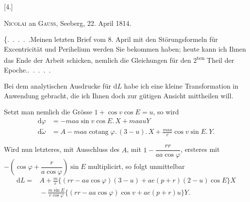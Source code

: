 \clearpage
\begingroup
{}
\renewcommand{\headrulewidth}{0pt}
\par\medskip
{}
\begin{center}
[4.]\par\medskip
\textsc{Nicolai} an \textsc{Gauss}, Seeberg, 22. April 1814.
\end{center}
\par\noindent\hspace*{\parindent}\{.\ .\ .\ .\ .\quad Meinen letzten Brief vom 8. April mit den Störungsformeln für
Excentricität und Perihelium werden Sie bekommen haben; heute kann ich
Ihnen das Ende der Arbeit schicken, nemlich die Gleichungen für den 2\textsuperscript{ten}
Theil der Epoche.\quad .\ .\ .\ .\ .

\par\noindent\hspace*{\parindent}Bei dem analytischen Ausdrucke für \(\mathrm{d}L\) habe ich eine kleine Transformation
in Anwendung gebracht, die ich Ihnen doch zur gütigen Ansicht mittheilen will.

\par\noindent\hspace*{\parindent}Setzt man nemlich die Grösse \(1+\cos v\cos E=u\), so wird
\[
\begin{aligned}
\mathrm{d}\varphi&=-maa\sin v\cos E\mathord{.}\,X+maauY\\
\mathrm{d}\tilde\omega&=A-maa\operatorname{cotang}\varphi\mathord{.}\,(3-u)\mathord{.}\,X
  +\frac{maa}{e}\cos v\sin E\mathord{.}\,Y.
\end{aligned}
\]

\par\noindent\hspace*{\parindent}Wird nun letzteres, mit Ausschluss des \(A\), mit \(1-\dfrac{rr}{aa\cos\varphi}\), ersteres mit
\(-\left(\cos\varphi+\dfrac{r}{a\cos\varphi}\right)\sin E\) multiplicirt, so folgt unmittelbar
\[
\begin{aligned}
\mathrm{d}L={}&A+\frac{m}{e}\bigl\{(rr-aa\cos\varphi)(3-u)+ae(p+r)(2-u)\cos E\bigr\}X\\
 &{}-\frac{m\sin E}{e\cos\varphi}\bigl\{(rr-aa\cos\varphi)\cos v+ae(p+r)u\bigr\}Y.
\end{aligned}
\]

